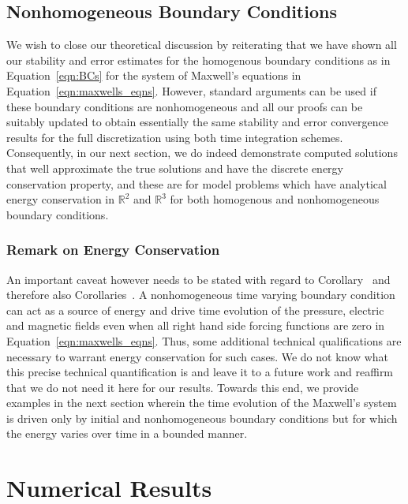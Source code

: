 \documentclass{amsart}
\theoremstyle{thmstyleone}%
\theoremstyle{thmstyletwo}%
\theoremstyle{thmstylethree}%
\def\R{\mathbb{R}}
\begin{document}
\subsection{Nonhomogeneous Boundary Conditions}

We wish to close our theoretical discussion by reiterating that we have shown all our stability and error estimates for the homogenous boundary conditions as in Equation~\eqref{eqn:BCs} for the system of Maxwell's equations in Equation~\eqref{eqn:maxwells_eqns}. However, standard arguments can be used if these boundary conditions are nonhomogeneous and all our proofs can be suitably updated to obtain essentially the same stability and error convergence results for the full discretization using both time integration schemes. Consequently, in our next section, we do indeed demonstrate computed solutions that well approximate the true solutions and have the discrete energy conservation property, and these are for model problems which have analytical energy conservation in $\R^2$ and $\R^3$ for both homogenous and nonhomogeneous boundary conditions.

\subsubsection{Remark on Energy Conservation}

An important caveat however needs to be stated with regard to Corollary~ and therefore also Corollaries~. A nonhomogeneous time varying boundary condition can act as a source of energy and drive time evolution of the pressure, electric and magnetic fields even when all right hand side forcing functions are zero in Equation~\eqref{eqn:maxwells_eqns}. Thus, some additional technical qualifications are necessary to warrant energy conservation for such cases. We do not know what this precise technical quantification is and leave it to a future work and reaffirm that we do not need it here for our results. Towards this end, we provide examples in the next section wherein the time evolution of the Maxwell's system is driven only by initial and nonhomogeneous boundary conditions but for which the energy varies over time in a bounded manner.


\section{Numerical Results}\label{sec:numerics}
\end{document}
